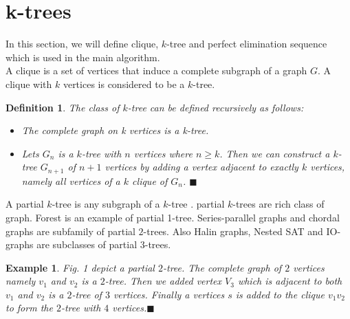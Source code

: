 \documentclass[11pt]{article}
\newtheorem*{defi}{Definition}
\newtheorem{exmp}{Example}[section]
\begin{document}
\section{k-trees}
\label{sec:ktree}
In this section, we will define clique, $k$-tree and perfect elimination sequence which is used in the main algorithm.\\
A clique is a set of vertices that induce a complete subgraph of a graph \(G\). A clique with \(k\) vertices is considered to be a \(k\)-tree.%
\begin{defi}
\normalfont
The class of  \(k\)-tree can be  defined recursively as follows: 
\begin{itemize}[noitemsep,nolistsep]
 \item The complete graph on k vertices is a k-tree.
 \item Lets \(G_n\) is a \(k\)-tree  with $n$ vertices where $n\geq k$. Then we can construct a $k$-tree $G_{n+1}$ of $n+1$ vertices by adding a vertex adjacent to exactly $k$ vertices, namely all vertices of a $k$ clique of $G_n$. $\blacksquare$
\end{itemize}

\end{defi}
  A partial \(k\)-tree is any subgraph of a \(k\)-tree . partial \(k\)-trees are rich class of graph. Forest is an example of partial 1-tree. Series-parallel graphs and chordal graphs are subfamily of partial \(2\)-trees. Also Halin graphs, Nested SAT and IO-graphs are subclasses of partial \(3\)-trees.
  

  \begin{exmp}
  \normalfont
  Fig. 1 depict a partial $2$-tree. The complete graph of $2$ vertices namely $v_1$ and $v_2$ is a $2$-tree. Then we added vertex $V_3$ which is adjacent to both $v_1$ and $v_2$ is a $2$-tree of $3$ vertices. Finally a vertices $s$ is added to the clique $v_1v_2$ to form the $2$-tree with $4$ vertices.$\blacksquare$
  \end{exmp}
\end{document}
